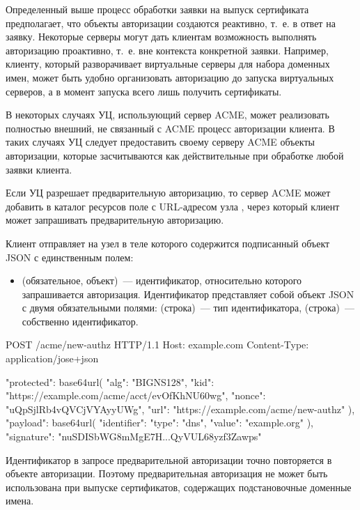 Определенный выше процесс обработки заявки на выпуск сертификата предполагает, 
что объекты авторизации создаются реактивно, т.~е. в ответ на заявку. 
Некоторые серверы могут дать клиентам возможность выполнять авторизацию 
проактивно, т.~е. вне контекста конкретной заявки. Например, клиенту, который 
разворачивает виртуальные серверы для набора доменных имен, может быть удобно 
организовать авторизацию до запуска виртуальных серверов, а в момент запуска
всего лишь получить сертификаты. 

В некоторых случаях УЦ, использующий сервер ACME, может реализовать полностью 
внешний, не связанный с ACME процесс авторизации клиента. В таких случаях УЦ 
следует предоставить своему серверу ACME объекты авторизации, которые 
засчитываются как действительные при обработке любой заявки клиента. 

Если УЦ разрешает предварительную авторизацию, то сервер ACME может добавить
в каталог ресурсов поле  с URL-адресом узла ,
через который клиент может запрашивать предварительную авторизацию.

Клиент отправляет на узел   
в теле которого содержится подписанный объект JSON с единственным полем:

\begin{itemize}
\item
{} (обязательное, объект)~---
идентификатор, относительно которого запрашивается авторизация. 
%
Идентификатор представляет собой объект JSON с двумя обязательными 
полями:
 (строка)~--- тип идентификатора,
 (строка)~--- собственно идентификатор. 
\end{itemize}

POST /acme/new-authz HTTP/1.1
Host: example.com
Content-Type: application/jose+json

\begin{codeblock}
{
  "protected": base64url({
    "alg": "BIGNS128",
    "kid": "https://example.com/acme/acct/evOfKhNU60wg",
    "nonce": "uQpSjlRb4vQVCjVYAyyUWg",
    "url": "https://example.com/acme/new-authz"
  }),
  "payload": base64url({
    "identifier": {
      "type": "dns",
      "value": "example.org"
    }
  }),
  "signature": "nuSDISbWG8mMgE7H...QyVUL68yzf3Zawps"
}
\end{codeblock}
\fi

Идентификатор в запросе предварительной авторизации точно повторяется в объекте 
авторизации. Поэтому предварительная авторизация не может быть использована при 
выпуске сертификатов, содержащих подстановочные доменные имена.

